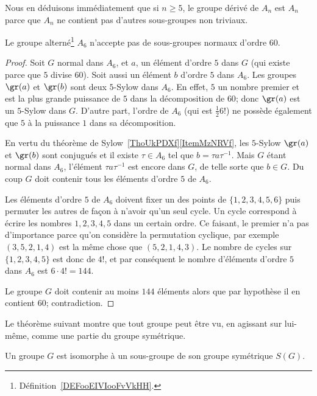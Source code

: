 Nous en déduisons immédiatement que si \( n\geq 5\), le groupe dérivé de \( A_n\) est \( A_n\) parce que \( A_n\) ne contient pas d'autres sous-groupes non triviaux.

\begin{lemma}       \label{LEMooICEHooGSSpkq}
    Le groupe alterné\footnote{Définition~\ref{DEFooEIVIooFvVkHH}.} \( A_6\) n'accepte pas de sous-groupes normaux d'ordre \( 60\).
\end{lemma}

\begin{proof}
    Soit \( G\) normal dans \( A_6\), et \( a\), un élément d'ordre \( 5\) dans \( G\) (qui existe parce que \( 5\) divise \( 60\)). Soit aussi un élément \( b\) d'ordre \( 5\) dans \( A_6\). Les groupes \( \gr(a)\) et \( \gr(b)\) sont deux \( 5\)-Sylow dans \( A_6\). En effet, \( 5\) un nombre premier et est la plus grande puissance de \( 5\) dans la décomposition de \( 60\); donc \( \gr(a)\) est un \( 5\)-Sylow dans \( G\). D'autre part, l'ordre de \( A_6\) (qui est \( \frac{ 1 }{2}6!\)) ne possède également que \( 5\) à la puissance \( 1\) dans sa décomposition.

    En vertu du théorème de Sylow~\ref{ThoUkPDXf}\ref{ItemMzNRVf}, les \( 5\)-Sylow \( \gr(a)\) et \( \gr(b)\) sont conjugués et il existe \( \tau\in A_6\) tel que \( b=\tau a\tau^{-1}\). Mais \( G\) étant normal dans \( A_6\), l'élément \( \tau a\tau^{-1}\) est encore dans \( G\), de telle sorte que \( b\in G\). Du coup \( G\) doit contenir tous les éléments d'ordre \( 5\) de \( A_6\).

    Les éléments d'ordre $5$ de \( A_6\) doivent fixer un des points de \( \{ 1,2,3,4,5,6 \}\) puis permuter les autres de façon à n'avoir qu'un seul cycle. Un cycle correspond à écrire les nombres \( 1,2,3,4,5\) dans un certain ordre. Ce faisant, le premier n'a pas d'importance parce qu'on considère la permutation cyclique, par exemple \( (3,5,2,1,4)\) est la même chose que \( (5,2,1,4,3)\). Le nombre de cycles sur \( \{ 1,2,3,4,5 \}\) est donc de \( 4!\), et par conséquent le nombre d'éléments d'ordre \( 5\) dans \( A_6\) est \( 6\cdot 4!=144\).

    Le groupe \( G\) doit contenir au moins \( 144\) éléments alors que par hypothèse il en contient \( 60\); contradiction.
\end{proof}

Le théorème suivant montre que tout groupe peut être vu, en agissant sur lui-même, comme une partie du groupe symétrique.
\begin{theorem}
    Un groupe \( G\) est isomorphe à un sous-groupe de son groupe symétrique \( S(G)\).
\end{theorem}

